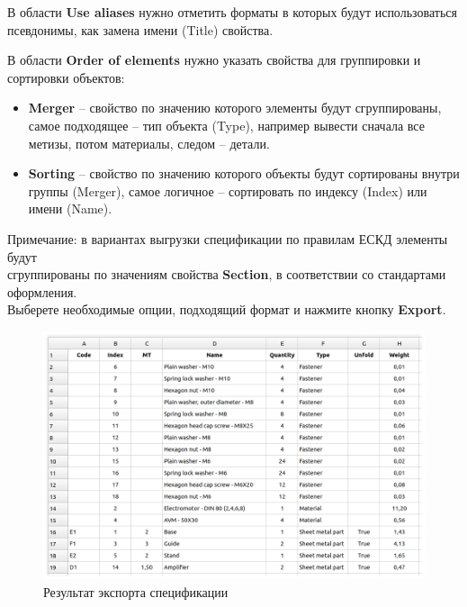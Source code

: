 \documentclass[a4paper,12pt]{article}
\begin{document}
В области \textbf{Use aliases} нужно отметить форматы в которых будут использоваться псевдонимы, как замена имени (Title) свойства.\\

\pagebreak




В области \textbf{Order of elements} нужно указать свойства для группировки и сортировки объектов:

\begin{itemize}
	\item \textbf{Merger} -- свойство по значению которого элементы будут сгруппированы, самое подходящее -- тип объекта (Type), например вывести сначала все метизы, потом материалы, следом -- детали.
	\item \textbf{Sorting} -- свойство по значению которого объекты будут сортированы внутри группы (Merger), самое логичное -- сортировать по индексу (Index) или имени (Name).
\end{itemize}

Примечание: в вариантах выгрузки спецификации по правилам ЕСКД элементы будут\\сгруппированы по значениям свойства \textbf{Section}, в соответствии со стандартами оформления.\\

Выберете необходимые опции, подходящий формат и нажмите кнопку \textbf{Export}.

\begin{figure}[htp]
	\centering
	\includegraphics[width=1\textwidth]{img/specification_result.png}
	\caption{Результат экспорта спецификации}
	\label{sec:specification_result}
\end{figure}
\end{document}
